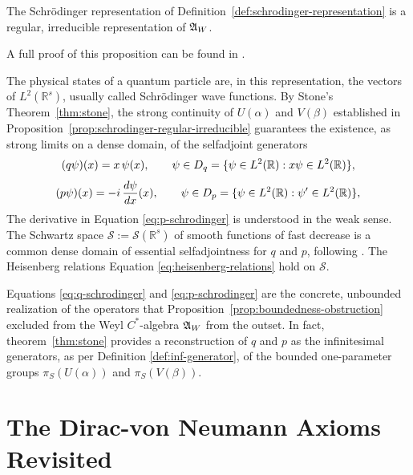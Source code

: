 	\begin{proposition}
		\label{prop:schrodinger-regular-irreducible}
		The Schr\"odinger representation of Definition~\ref{def:schrodinger-representation} is a regular, irreducible representation of $\mathfrak{A}_W$.
	\end{proposition}
	
	\noindent A full proof of this proposition can be found in \cite[p.65]{strocchiIntroductionMathematicalStructure2005}.
	
	\begin{remark}
		\label{rem:schrodinger-generators}
		The physical states of a quantum particle are, in this representation, the vectors of $L^2(\mathbb{R}^s)$, usually called Schr\"odinger wave functions. By Stone's Theorem~\ref{thm:stone}, the strong continuity of $U(\alpha)$ and $V(\beta)$ established in Proposition~\ref{prop:schrodinger-regular-irreducible} guarantees the existence, as strong limits on a dense domain, of the selfadjoint generators
		\begin{equation}
			(q\psi)(x) = x\,\psi(x), \qquad \psi \in D_q = \{\psi \in L^2(\mathbb{R}) : x\psi \in L^2(\mathbb{R})\},
			\label{eq:q-schrodinger}
		\end{equation}
		\begin{equation}
			(p\psi)(x) = -i\,\frac{d\psi}{dx}(x), \qquad \psi \in D_p = \{\psi \in L^2(\mathbb{R}) : \psi' \in L^2(\mathbb{R})\},
			\label{eq:p-schrodinger}
		\end{equation}
		The derivative in Equation \eqref{eq:p-schrodinger} is understood in the weak sense. The Schwartz space $\mathcal{S} := \mathcal{S}(\mathbb{R}^s)$ of smooth functions of fast decrease is a common dense domain of essential selfadjointness for $q$ and $p$, following \cite[Chapter VIII, Section 2]{reedMethodsModernMathematical2003}. The Heisenberg relations Equation \eqref{eq:heisenberg-relations} hold on $\mathcal{S}$.
		
		Equations \eqref{eq:q-schrodinger} and \eqref{eq:p-schrodinger} are the concrete, unbounded realization of the operators that Proposition~\ref{prop:boundedness-obstruction} excluded from the Weyl $C^*$-algebra $\mathfrak{A}_W$ from the outset. In fact, theorem~\ref{thm:stone} provides a reconstruction of $q$ and $p$ as the infinitesimal generators, as per Definition \ref{def:inf-generator}, of the bounded one-parameter groups $\pi_S(U(\alpha))$ and $\pi_S(V(\beta))$.
	\end{remark}

	
	\section{The Dirac-von Neumann Axioms Revisited}
	\label{sec:concl-dvn-axioms}
	
